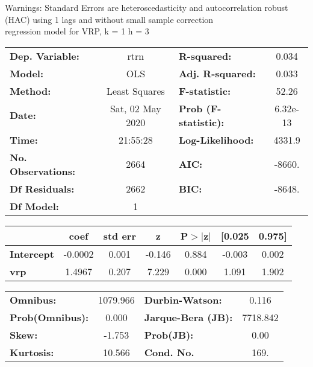 Warnings: \newline
 [1] Standard Errors are heteroscedasticity and autocorrelation robust (HAC) using 1 lags and without small sample correction\\ 

regression model for VRP, k = 1 h = 3\begin{center}
\begin{tabular}{lclc}
\toprule
\textbf{Dep. Variable:}    &       rtrn       & \textbf{  R-squared:         } &     0.034   \\
\textbf{Model:}            &       OLS        & \textbf{  Adj. R-squared:    } &     0.033   \\
\textbf{Method:}           &  Least Squares   & \textbf{  F-statistic:       } &     52.26   \\
\textbf{Date:}             & Sat, 02 May 2020 & \textbf{  Prob (F-statistic):} &  6.32e-13   \\
\textbf{Time:}             &     21:55:28     & \textbf{  Log-Likelihood:    } &    4331.9   \\
\textbf{No. Observations:} &        2664      & \textbf{  AIC:               } &    -8660.   \\
\textbf{Df Residuals:}     &        2662      & \textbf{  BIC:               } &    -8648.   \\
\textbf{Df Model:}         &           1      & \textbf{                     } &             \\
\bottomrule
\end{tabular}
\begin{tabular}{lcccccc}
                   & \textbf{coef} & \textbf{std err} & \textbf{z} & \textbf{P$> |$z$|$} & \textbf{[0.025} & \textbf{0.975]}  \\
\midrule
\textbf{Intercept} &      -0.0002  &        0.001     &    -0.146  &         0.884        &       -0.003    &        0.002     \\
\textbf{vrp}       &       1.4967  &        0.207     &     7.229  &         0.000        &        1.091    &        1.902     \\
\bottomrule
\end{tabular}
\begin{tabular}{lclc}
\textbf{Omnibus:}       & 1079.966 & \textbf{  Durbin-Watson:     } &    0.116  \\
\textbf{Prob(Omnibus):} &   0.000  & \textbf{  Jarque-Bera (JB):  } & 7718.842  \\
\textbf{Skew:}          &  -1.753  & \textbf{  Prob(JB):          } &     0.00  \\
\textbf{Kurtosis:}      &  10.566  & \textbf{  Cond. No.          } &     169.  \\
\bottomrule
\end{tabular}
\end{center}

